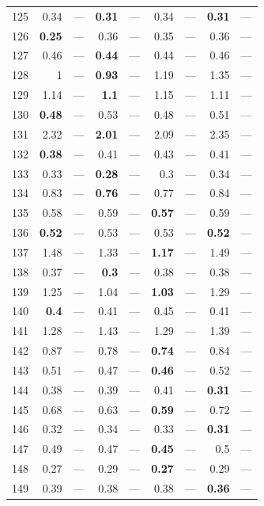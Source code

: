 \begin{longtable}{lr@{\hskip 4pt}l@{\hskip 12pt}r@{\hskip 4pt}l@{\hskip 12pt}r@{\hskip 4pt}l@{\hskip 12pt}r@{\hskip 4pt}l@{\hskip 12pt}}
125 & 0.34 & --- & \textbf{0.31} & --- & 0.34 & --- & \textbf{0.31} & --- \\
126 & \textbf{0.25} & --- & 0.36 & --- & 0.35 & --- & 0.36 & --- \\
127 & 0.46 & --- & \textbf{0.44} & --- & 0.44 & --- & 0.46 & --- \\
128 & 1 & --- & \textbf{0.93} & --- & 1.19 & --- & 1.35 & --- \\
129 & 1.14 & --- & \textbf{1.1} & --- & 1.15 & --- & 1.11 & --- \\
130 & \textbf{0.48} & --- & 0.53 & --- & 0.48 & --- & 0.51 & --- \\
131 & 2.32 & --- & \textbf{2.01} & --- & 2.09 & --- & 2.35 & --- \\
132 & \textbf{0.38} & --- & 0.41 & --- & 0.43 & --- & 0.41 & --- \\
133 & 0.33 & --- & \textbf{0.28} & --- & 0.3 & --- & 0.34 & --- \\
134 & 0.83 & --- & \textbf{0.76} & --- & 0.77 & --- & 0.84 & --- \\
135 & 0.58 & --- & 0.59 & --- & \textbf{0.57} & --- & 0.59 & --- \\
136 & \textbf{0.52} & --- & 0.53 & --- & 0.53 & --- & \textbf{0.52} & --- \\
137 & 1.48 & --- & 1.33 & --- & \textbf{1.17} & --- & 1.49 & --- \\
138 & 0.37 & --- & \textbf{0.3} & --- & 0.38 & --- & 0.38 & --- \\
139 & 1.25 & --- & 1.04 & --- & \textbf{1.03} & --- & 1.29 & --- \\
140 & \textbf{0.4} & --- & 0.41 & --- & 0.45 & --- & 0.41 & --- \\
141 & 1.28 & --- & 1.43 & --- & 1.29 & --- & 1.39 & --- \\
142 & 0.87 & --- & 0.78 & --- & \textbf{0.74} & --- & 0.84 & --- \\
143 & 0.51 & --- & 0.47 & --- & \textbf{0.46} & --- & 0.52 & --- \\
144 & 0.38 & --- & 0.39 & --- & 0.41 & --- & \textbf{0.31} & --- \\
145 & 0.68 & --- & 0.63 & --- & \textbf{0.59} & --- & 0.72 & --- \\
146 & 0.32 & --- & 0.34 & --- & 0.33 & --- & \textbf{0.31} & --- \\
147 & 0.49 & --- & 0.47 & --- & \textbf{0.45} & --- & 0.5 & --- \\
148 & 0.27 & --- & 0.29 & --- & \textbf{0.27} & --- & 0.29 & --- \\
149 & 0.39 & --- & 0.38 & --- & 0.38 & --- & \textbf{0.36} & --- \\

\end{longtable}
